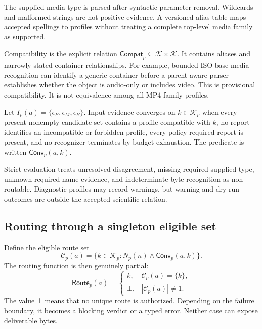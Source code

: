 The supplied media type is parsed after syntactic parameter removal. Wildcards
and malformed strings are not positive evidence. A versioned alias table maps
accepted spellings to profiles without treating a complete top-level media
family as supported.

Compatibility is the explicit relation
$\mathsf{Compat}_p\subseteq\mathcal{K}\times\mathcal{K}$. It contains aliases
and narrowly stated container relationships. For example, bounded ISO base
media recognition can identify a generic container before a parent-aware parser
establishes whether the object is audio-only or includes video. This is
provisional compatibility. It is not equivalence among all MP4-family profiles.

\begin{definition}
\label{def:input-convergence}
Let $I_p(a)=\{\epsilon_E,\epsilon_M,\epsilon_B\}$. Input evidence converges on
$k\in\mathcal{K}_p$ when every present nonempty candidate set contains a profile
compatible with $k$, no report identifies an incompatible or forbidden profile,
every policy-required report is present, and no recognizer terminates by budget
exhaustion. The predicate is written $\mathsf{Conv}_p(a,k)$.
\end{definition}

Strict evaluation treats unresolved disagreement, missing required supplied
type, unknown required name evidence, and indeterminate byte recognition as
non-routable. Diagnostic profiles may record warnings, but warning and dry-run
outcomes are outside the accepted scientific relation.

\subsection{Routing through a singleton eligible set}

Define the eligible route set
\begin{equation}
  \mathcal{C}_p(a)=
  \{k\in\mathcal{K}_p:N_p(n)\land\mathsf{Conv}_p(a,k)\}.
  \label{eq:eligible-routes}
\end{equation}
The routing function is then genuinely partial:
\begin{equation}
  \mathsf{Route}_p(a)=
  \begin{cases}
    k, & \mathcal{C}_p(a)=\{k\},\\
    \bot, & |\mathcal{C}_p(a)|\neq 1.
  \end{cases}
  \label{eq:routing-function}
\end{equation}
The value $\bot$ means that no unique route is authorized. Depending on the
failure boundary, it becomes a blocking verdict or a typed error. Neither case
can expose deliverable bytes.

